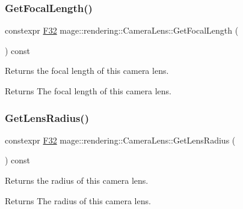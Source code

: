\subsubsection{\texorpdfstring{Get\+Focal\+Length()}{GetFocalLength()}}
{\footnotesize\ttfamily constexpr \mbox{\hyperlink{namespacemage_aa97e833b45f06d60a0a9c4fc22ae02c0}{F32}} mage\+::rendering\+::\+Camera\+Lens\+::\+Get\+Focal\+Length (\begin{DoxyParamCaption}{ }\end{DoxyParamCaption}) const\hspace{0.3cm}{\ttfamily [noexcept]}}

Returns the focal length of this camera lens.

\begin{DoxyReturn}{Returns}
The focal length of this camera lens. 
\end{DoxyReturn}
\mbox{\label{classmage_1_1rendering_1_1_camera_lens_a2cfbec82b5e74c9a481d53944ad6a508}} 
\subsubsection{\texorpdfstring{Get\+Lens\+Radius()}{GetLensRadius()}}
{\footnotesize\ttfamily constexpr \mbox{\hyperlink{namespacemage_aa97e833b45f06d60a0a9c4fc22ae02c0}{F32}} mage\+::rendering\+::\+Camera\+Lens\+::\+Get\+Lens\+Radius (\begin{DoxyParamCaption}{ }\end{DoxyParamCaption}) const\hspace{0.3cm}{\ttfamily [noexcept]}}

Returns the radius of this camera lens.

\begin{DoxyReturn}{Returns}
The radius of this camera lens. 
\end{DoxyReturn}
\mbox{\label{classmage_1_1rendering_1_1_camera_lens_aea9eeadbb33600a036a57e797776cbc6}} 

